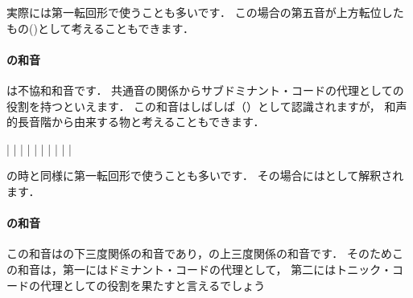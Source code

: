 \documentclass[dvipdfmx,uplatex,b5paper,openany,jbase=12Q,nomag*,textwidth-limit=44%
               ]{gachimuchi}[2020/05/05]
\begin{document}
実際には第一転回形で使うことも多いです．
この場合の第五音が上方転位したもの()として考えることもできます．

\paragraph{\Gnii\Dimt の和音}
\Gnii\Dimt は不協和和音です．
共通音の関係からサブドミナント・コードの代理としての役割を持つといえます．
この和音はしばしば（）として認識されますが，
和声的長音階から由来する物と考えることもできます．

\begin{floatMusic}[pos=ht]
  \Startpiece%
  \znotes|\en
  \NOTes
  |%
  \en\bar
  \NOTEs
  |%
  \en\doublebar
  \NOTEs
  |%
  \en\bar
  \NOTEs
  |%
  \en\doublebar
  \NOTes
  |%
  \en\bar
  \NOTes
  \Mryaku\sk%
  |%
  \Mryaku\sk
  \en\setdoublebar
  \endpiece%
\end{floatMusic}

\Gnii\Min の時と同様に第一転回形で使うことも多いです．
その場合にはとして解釈されます．
\paragraph{\Gniii\Min の和音}
この和音は\Gnv の下三度関係の和音であり，\Gni の上三度関係の和音です．
そのためこの和音は，第一にはドミナント・コードの代理として，
第二にはトニック・コードの代理としての役割を果たすと言えるでしょう
\end{document}
